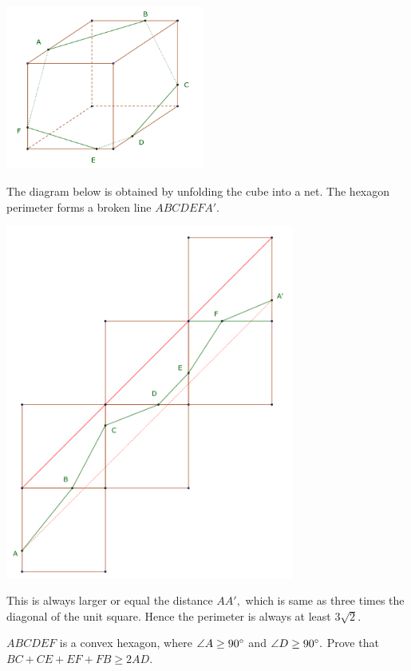 \documentclass{article}
\begin{document}
\begin{center}
    \includegraphics[width=6.5cm]{./svg/pdf/pi-2023-02-01.pdf}
\end{center}

\begin{soln}
    The diagram below is obtained by unfolding the cube into a net. The hexagon perimeter forms a broken line $ABCDEFA'.$
    \begin{center}
        \includegraphics[width=9.5cm]{./svg/pdf/pi-2023-02-02.pdf}
    \end{center}    
    This is always larger or equal the distance $AA',$ which is same as three times the diagonal of the unit square.
    Hence the perimeter is always at least $\boxed{3\sqrt{2}}.$
\end{soln}

\begin{example*}

    $ABCDEF$ is a convex hexagon, where $\angle A \ge 90^\circ$ and $\angle D \ge 90^\circ.$
    Prove that $BC+CE+EF+FB\ge 2AD.$
\end{example*}
\end{document}
